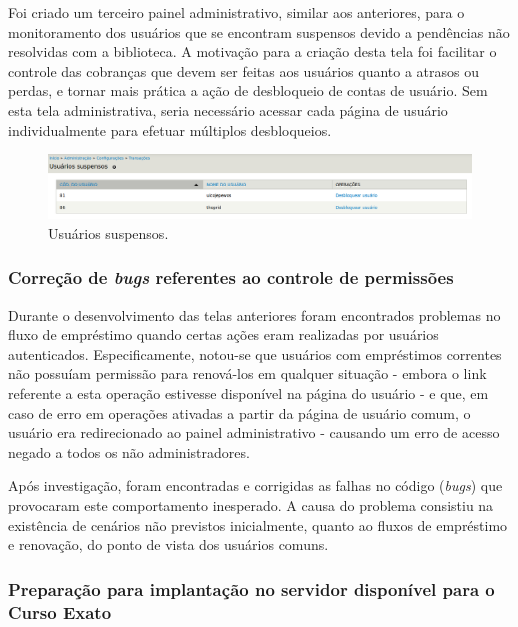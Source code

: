 \documentclass[a4paper]{article}
\begin{document}
Foi criado um terceiro painel administrativo, similar aos anteriores, para o monitoramento dos usuários que se encontram suspensos devido a pendências não resolvidas com a biblioteca. A motivação para a criação desta tela foi facilitar o controle das cobranças que devem ser feitas aos usuários quanto a atrasos ou perdas, e tornar mais prática a ação de desbloqueio de contas de usuário. Sem esta tela administrativa, seria necessário acessar cada página de usuário individualmente para efetuar múltiplos desbloqueios.

\begin{figure}[pbth!]
\centering
\includegraphics[width=120mm]{img/suspended-users.png}
\caption{Usuários suspensos.\label{suspended-users}}
\end{figure}

\subsubsection{Correção de \textit{bugs} referentes ao controle de permissões}
    
Durante o desenvolvimento das telas anteriores foram encontrados problemas no fluxo de empréstimo quando certas ações eram realizadas por usuários autenticados. Especificamente, notou-se que usuários com empréstimos correntes não possuíam permissão para renová-los em qualquer situação - embora o link referente a esta operação estivesse disponível na página do usuário - e que, em caso de erro em operações ativadas a partir da página de usuário comum, o usuário era redirecionado ao painel administrativo - causando um erro de acesso negado a todos os não administradores.

Após investigação, foram encontradas e corrigidas as falhas no código (\textit{bugs}) que provocaram este comportamento inesperado. A causa do problema consistiu na existência de cenários não previstos inicialmente, quanto ao fluxos de empréstimo e renovação, do ponto de vista dos usuários comuns.

\subsubsection{Preparação para implantação no servidor disponível para o Curso Exato}
\end{document}
